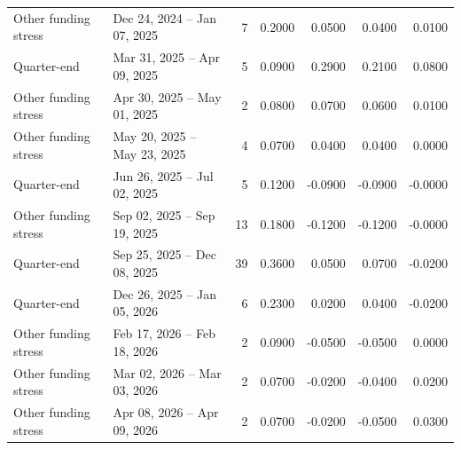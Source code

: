 \begin{table}[htbp]
{\begin{tabular}{llrrrrr}
  Other funding stress & Dec 24, 2024 -- Jan 07, 2025 & 7 & 0.2000 & 0.0500 & 0.0400 & 0.0100 \\ 
  Quarter-end & Mar 31, 2025 -- Apr 09, 2025 & 5 & 0.0900 & 0.2900 & 0.2100 & 0.0800 \\ 
  Other funding stress & Apr 30, 2025 -- May 01, 2025 & 2 & 0.0800 & 0.0700 & 0.0600 & 0.0100 \\ 
  Other funding stress & May 20, 2025 -- May 23, 2025 & 4 & 0.0700 & 0.0400 & 0.0400 & 0.0000 \\ 
  Quarter-end & Jun 26, 2025 -- Jul 02, 2025 & 5 & 0.1200 & -0.0900 & -0.0900 & -0.0000 \\ 
  Other funding stress & Sep 02, 2025 -- Sep 19, 2025 & 13 & 0.1800 & -0.1200 & -0.1200 & -0.0000 \\ 
  Quarter-end & Sep 25, 2025 -- Dec 08, 2025 & 39 & 0.3600 & 0.0500 & 0.0700 & -0.0200 \\ 
  Quarter-end & Dec 26, 2025 -- Jan 05, 2026 & 6 & 0.2300 & 0.0200 & 0.0400 & -0.0200 \\ 
  Other funding stress & Feb 17, 2026 -- Feb 18, 2026 & 2 & 0.0900 & -0.0500 & -0.0500 & 0.0000 \\ 
  Other funding stress & Mar 02, 2026 -- Mar 03, 2026 & 2 & 0.0700 & -0.0200 & -0.0400 & 0.0200 \\ 
  Other funding stress & Apr 08, 2026 -- Apr 09, 2026 & 2 & 0.0700 & -0.0200 & -0.0500 & 0.0300 \\ 
   \bottomrule
\end{tabular}
}
\end{table}
